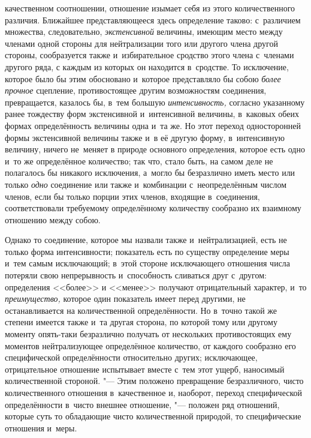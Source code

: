 качественном соотношении, отношение изымает себя из этого количественного
различия. Ближайшее представляющееся здесь определение таково: с~различием
множества, следовательно, {\em экстенсивной} величины, имеющим место между
членами одной стороны для нейтрализации того или другого члена другой стороны,
сообразуется также и~избирательное сродство этого члена с~членами другого ряда,
с каждым из которых он находится в~сродстве. То исключение, которое было бы
этим обосновано и~которое представляло бы собою {\em более прочное} сцепление,
противостоящее другим возможностям соединения, превращается, казалось бы, в~тем
большую {\em интенсивность,} согласно указанному ранее тождеству форм
экстенсивной и~интенсивной величины, в~каковых обеих формах определённость
величины одна и~та же. Но этот переход односторонней формы экстенсивной
величины также и~в её другую форму, в~интенсивную величину, ничего не~меняет
в природе основного определения, которое есть одно и~то же определённое
количество; так что, стало быть, на самом деле не полагалось бы никакого
исключения, а~могло бы безразлично иметь место или только {\em одно} соединение
или также и~комбинации с~неопределённым числом членов, если бы только порции
этих членов, входящие в~соединения, соответствовали требуемому определённому
количеству сообразно их взаимному отношению между собою.

Однако то соединение, которое мы назвали также и~нейтрализацией, есть не только
форма интенсивности; показатель есть по существу определение меры и~тем самым
исключающий; в~этой стороне исключающего отношения числа потеряли свою
непрерывность и~способность сливаться друг с~другом: определения <<более>> и
<<менее>> получают отрицательный характер, и~то {\em преимущество,} которое
один показатель имеет перед другими, не останавливается на количественной
определённости. Но в~точно такой же степени имеется также и~та другая сторона,
по которой тому или другому моменту опять-таки безразлично получать от
нескольких противостоящих ему моментов нейтрализующее определённое количество,
от каждого сообразно его специфической определённости относительно других;
исключающее, отрицательное отношение испытывает вместе с~тем этот ущерб,
наносимый количественной стороной. "--- Этим положено превращение
безразличного, чисто количественного отношения в~качественное и, наоборот,
переход специфической определённости в~чисто внешнее отношение, "--- положен
ряд отношений, которые суть то обладающие чисто количественной природой, то
специфические отношения и~меры.


